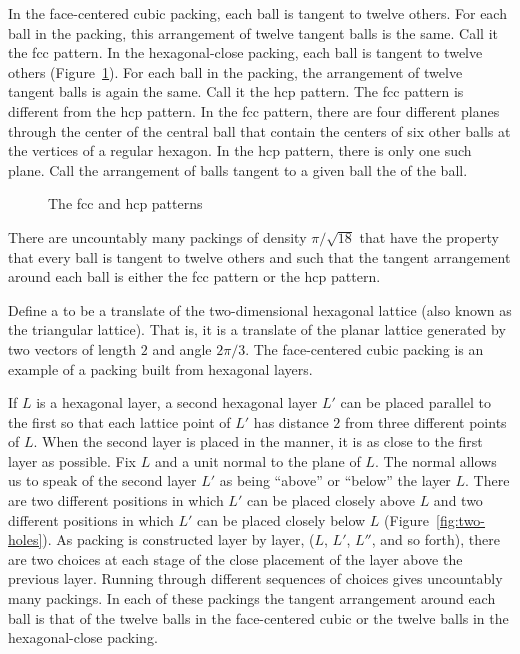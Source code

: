 In the face-centered cubic packing, each ball is tangent to twelve
others.  For each ball in the packing, this arrangement of twelve
tangent balls is the same.  Call it the fcc pattern.  In the
hexagonal-close packing, each ball is tangent to twelve others
(Figure~\ref{fig:hcp}).  For each ball in the packing, the arrangement
of twelve tangent balls is again the same.  Call it the hcp pattern.
The fcc pattern is different from the hcp pattern.  In the fcc
pattern, there are four different planes through the center of the
central ball that contain the centers of six other balls at the
vertices of a regular hexagon.  In the hcp pattern, there is only one
such plane.  Call the arrangement of balls tangent to a given ball the
 of the ball.

\begin{figure}[htb]
  \centering
  \caption{The fcc and hcp patterns}
  \label{fig:hcp}
\end{figure}

There are uncountably many packings of density $\pi/\sqrt{18}$ that
have the property that every ball is tangent to twelve others and such
that the tangent arrangement around each ball is either the fcc
pattern or the hcp pattern.

Define a  to be a translate of the
two-dimensional hexagonal lattice (also known as the triangular
lattice). That is, it is a translate of the planar lattice generated
by two vectors of length $2$ and angle $2\pi/3$.  The face-centered
cubic packing is an example of a packing built from hexagonal layers.

If $L$ is a hexagonal layer, a second hexagonal layer $L'$ can be
placed parallel to the first so that each lattice point of $L'$ has
distance $2$ from three different points of $L$.  When the second
layer is placed in the manner, it is as close to the first layer as
possible. Fix $L$ and a unit normal to the plane of $L$. The normal
allows us to speak of the second layer $L'$ as being ``above'' or
``below'' the layer $L$. There are two different positions in which
$L'$ can be placed closely above $L$ and two different positions in
which $L'$ can be placed closely below $L$
(Figure~\ref{fig:two-holes}). As packing is constructed layer by
layer, ($L$, $L'$, $L''$, and so forth), there are two choices at each
stage of the close placement of the layer above the previous
layer. Running through different sequences of choices gives
uncountably many packings.  In each of these packings the tangent
arrangement around each ball is that of the twelve balls in the
face-centered cubic or the twelve balls in the hexagonal-close
packing.

